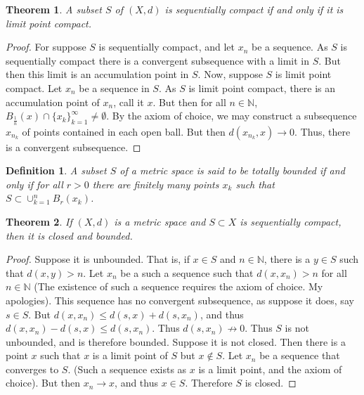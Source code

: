 \documentclass[oneside]{book}
\theoremstyle{mystyle}
\newtheorem{theorem}{Theorem}[section]
\newtheorem{definition}{Definition}[section]
\begin{document}
\begin{theorem}
A subset $S$ of $(X,d)$ is sequentially compact if and only if it is limit point compact.
\end{theorem}
\begin{proof}
For suppose $S$ is sequentially compact, and let $x_n$ be a sequence. As $S$ is sequentially compact there is a convergent subsequence with a limit in $S$. But then this limit is an accumulation point in $S$. Now, suppose $S$ is limit point compact. Let $x_n$ be a sequence in $S$. As $S$ is limit point compact, there is an accumulation point of $x_n$, call it $x$. But then for all $n\in \mathbb{N}$, $B_{\frac{1}{n}}(x)\cap \{x_k\}_{k=1}^{\infty}\ne \emptyset$. By the axiom of choice, we may construct a subsequence $x_{n_k}$ of points contained in each open ball. But then $d(x_{n_k},x)\rightarrow 0$. Thus, there is a convergent subsequence.
\end{proof}

\begin{definition}
A subset $S$ of a metric space is said to be totally bounded if and only if for all $r>0$ there are finitely many points $x_k$ such that $S\subset \cup_{k=1}^{n} B_{r}(x_k)$.
\end{definition}

\begin{theorem}
If $(X,d)$ is a metric space and $S\subset X$ is sequentially compact, then it is closed and bounded.
\end{theorem}
\begin{proof}
\item Suppose it is unbounded. That is, if $x\in S$ and $n\in \mathbb{N}$, there is a $y\in S$ such that $d(x,y)>n$. Let $x_n$ be a such a sequence such that $d(x,x_n)>n$ for all $n\in \mathbb{N}$ (The existence of such a sequence requires the axiom of choice. My apologies). This sequence has no convergent subsequence, as suppose it does, say $s\in S$. But $d(x,x_n) \leq d(s,x)+d(s,x_n)$, and thus $d(x,x_n)-d(s,x)\leq d(s,x_n)$. Thus $d(s,x_n) \not\rightarrow 0$. Thus $S$ is not unbounded, and is therefore bounded. Suppose it is not closed. Then there is a point $x$ such that $x$ is a limit point of $S$ but $x\notin S$. Let $x_n$ be a sequence that converges to $S$. (Such a sequence exists as $x$ is a limit point, and the axiom of choice). But then $x_n \rightarrow x$, and thus $x\in S$. Therefore $S$ is closed.
\end{proof}
\end{document}
